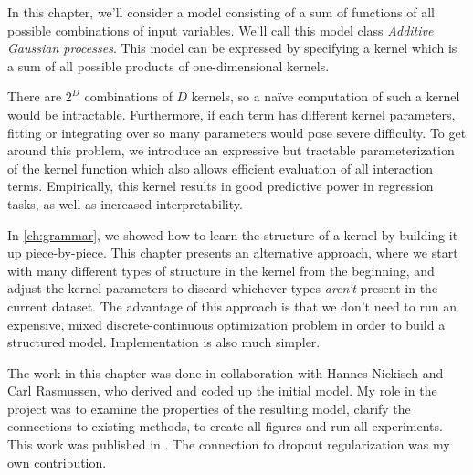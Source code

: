 In this chapter, we'll consider a \gp{} model consisting of a sum of functions of all possible combinations of input variables.
We'll call this model class \emph{Additive Gaussian processes}.
This model can be expressed by specifying a kernel which is a sum of all possible products of one-dimensional kernels.

There are $2^D$ combinations of $D$ kernels, so a na\"{i}ve computation of such a kernel would be intractable.
Furthermore, if each term has different kernel parameters, fitting or integrating over so many parameters would pose severe difficulty.
To get around this problem, we introduce an expressive but tractable parameterization of the kernel function which also allows efficient evaluation of all interaction terms.
Empirically, this kernel results in good predictive power in regression tasks, as well as increased interpretability.

In \cref{ch:grammar}, we showed how to learn the structure of a kernel by building it up piece-by-piece.
This chapter presents an alternative approach, where we start with many different types of structure in the kernel from the beginning, and adjust the kernel parameters to discard whichever types \emph{aren't} present in the current dataset.
The advantage of this approach is that we don't need to run an expensive, mixed discrete-continuous optimization problem in order to build a structured model.
Implementation is also much simpler.

The work in this chapter was done in collaboration with Hannes Nickisch and Carl Rasmussen, who derived and coded up the initial model.
My role in the project was to examine the properties of the resulting model, clarify the connections to existing methods, to create all figures and run all experiments.
This work was published in \citep{duvenaud2011additive11}.
The connection to dropout regularization was my own contribution.




